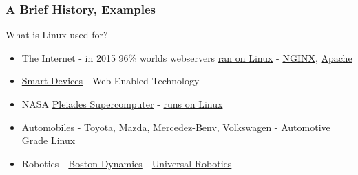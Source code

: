 \documentclass[fleqn]{beamer} %
\newcommand{\sectiontitleII}{A Brief History, Examples}
\begin{document}
	\begin{frame}[label=sectionII] \footnotesize
		\frametitle{\sectiontitleII}
		
		What is Linux used for? \vspcc

		\begin{itemize}

			\item The Internet - in 2015 96\% worlds webservers \href{https://www.zdnet.com/home-and-office/networking/can-the-internet-exist-without-linux/}{ran on Linux} - \href{https://www.nginx.com/}{NGINX}, \href{https://www.apache.org/}{Apache}

			\item \href{https://en.wikipedia.org/wiki/Smart_device}{Smart Devices} - Web Enabled Technology

			\item NASA \href{https://www.nas.nasa.gov/hecc/resources/pleiades.html}{Pleiades Supercomputer} - \href{https://www.nas.nasa.gov/hecc/support/kb/vnc-a-faster-alternative-to-x11_257.html}{runs on Linux}

			\item Automobiles - Toyota, Mazda, Mercedez-Benv, Volkswagen - \href{https://www.automotivelinux.org/}{Automotive Grade Linux}

			\item Robotics - \href{https://bostondynamics.com/}{Boston Dynamics} - \href{https://www.universal-robots.com/}{Universal Robotics}


		\end{itemize}

	\end{frame}
	
		
\end{document}
